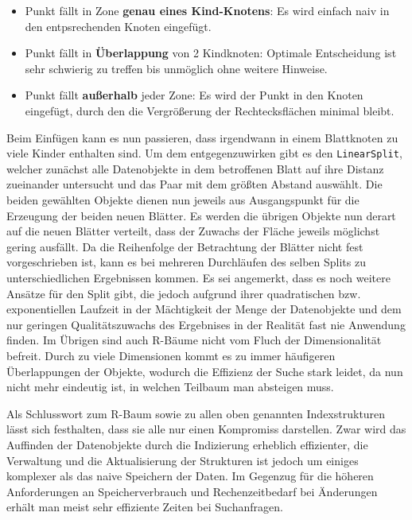 \begin{itemize}
	\item Punkt fällt in Zone \textbf{genau eines Kind-Knotens}: Es wird einfach naiv
		in den entpsrechenden Knoten eingefügt.
	\item Punkt fällt in \textbf{Überlappung} von 2 Kindknoten: Optimale Entscheidung ist
		sehr schwierig zu treffen bis unmöglich ohne weitere Hinweise.
	\item Punkt fällt \textbf{außerhalb} jeder Zone: Es wird der Punkt in den Knoten
		eingefügt, durch den die Vergrößerung der Rechtecksflächen minimal
		bleibt.
\end{itemize}

Beim Einfügen kann es nun passieren, dass irgendwann in einem Blattknoten zu
viele Kinder enthalten sind. Um dem entgegenzuwirken gibt es den
\texttt{LinearSplit}, welcher zunächst alle Datenobjekte in dem betroffenen Blatt
auf ihre Distanz zueinander untersucht und das Paar mit dem größten Abstand
auswählt. Die beiden gewählten Objekte dienen nun jeweils aus Ausgangspunkt für
die Erzeugung der beiden neuen Blätter. Es werden die übrigen Objekte nun derart
auf die neuen Blätter verteilt, dass der Zuwachs der Fläche jeweils möglichst gering
ausfällt. Da die Reihenfolge der Betrachtung der Blätter nicht fest vorgeschrieben
ist, kann es bei mehreren Durchläufen des selben Splits zu unterschiedlichen
Ergebnissen kommen.  Es sei angemerkt, dass es noch weitere Ansätze für den
Split gibt, die jedoch aufgrund ihrer quadratischen bzw. exponentiellen Laufzeit
in der Mächtigkeit der Menge der Datenobjekte und dem nur geringen Qualitätszuwachs
des Ergebnises in der Realität fast nie Anwendung finden. 
Im Übrigen sind auch R-Bäume nicht vom Fluch der Dimensionalität befreit. Durch
zu viele Dimensionen kommt es zu immer häufigeren Überlappungen der Objekte,
wodurch die Effizienz der Suche stark leidet, da nun nicht mehr eindeutig ist,
in welchen Teilbaum man absteigen muss.

Als Schlusswort zum R-Baum sowie zu allen oben genannten Indexstrukturen lässt
sich festhalten, dass sie alle nur einen Kompromiss darstellen. Zwar wird das
Auffinden der Datenobjekte durch die Indizierung erheblich effizienter, die
Verwaltung und die Aktualisierung der Strukturen ist jedoch um einiges komplexer
als das naive Speichern der Daten. Im Gegenzug für die höheren Anforderungen an
Speicherverbrauch und Rechenzeitbedarf bei Änderungen erhält man meist sehr effiziente
Zeiten bei Suchanfragen.


